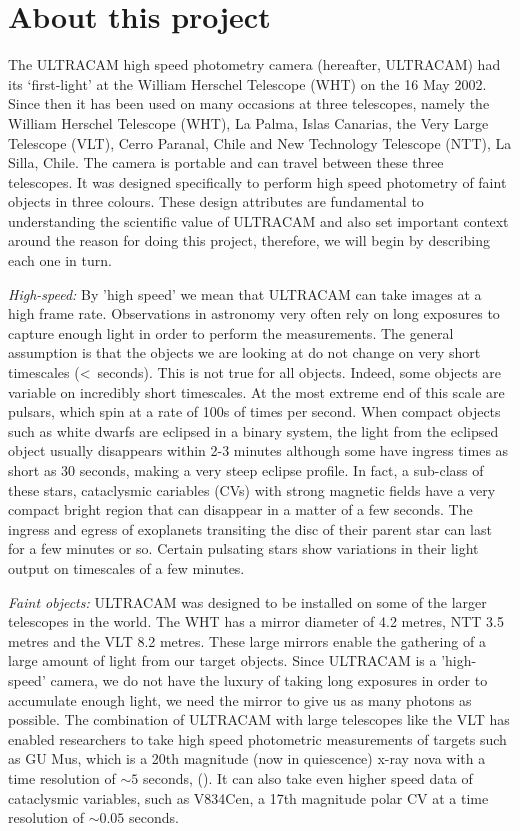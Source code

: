 \section{About this project} 

The ULTRACAM high speed photometry camera (hereafter, ULTRACAM) had its `first-light' at the William Herschel Telescope (WHT) on the 16 May 2002. Since then it has been used on many occasions at three telescopes, namely the William Herschel Telescope (WHT), La Palma, Islas Canarias, the Very Large Telescope (VLT), Cerro Paranal, Chile and New Technology Telescope (NTT), La Silla, Chile. The camera is portable and can travel between these three telescopes. It was designed specifically to perform high speed photometry of faint objects in three colours. These design attributes are fundamental to understanding the scientific value of ULTRACAM and also set important context around the reason for doing this project, therefore, we will begin by describing each one in turn. 

\emph{High-speed:} By 'high speed' we mean that ULTRACAM can take images at a high frame rate. Observations in astronomy very often rely on long exposures to capture enough light in order to perform the measurements. The general assumption is that the objects we are looking at do not change on very short timescales (\textless~seconds). This is not true for all objects. Indeed, some objects are variable on incredibly short timescales. At the most extreme end of this scale are pulsars, which spin at a rate of 100s of times per second. When compact objects such as white dwarfs are eclipsed in a binary system, the light from the eclipsed object usually disappears within 2-3 minutes although some have ingress times as short as 30 seconds, making a very steep eclipse profile. In fact, a sub-class of these stars, cataclysmic cariables (CVs) with strong magnetic fields have a very compact bright region that can disappear in a matter of a few seconds. The ingress and egress of exoplanets transiting the disc of their parent star can last for a few minutes or so. Certain pulsating stars show variations in their light output on timescales of a few minutes. 

\emph{Faint objects:} ULTRACAM was designed to be installed on some of the larger telescopes in the world. The WHT has a mirror diameter of 4.2 metres, NTT 3.5 metres and the VLT 8.2 metres. These large mirrors enable the gathering of a large amount of light from our target objects. Since ULTRACAM is a 'high-speed' camera, we do not have the luxury of taking long exposures in order to accumulate enough light, we need the mirror to give us as many photons as possible. The combination of ULTRACAM with large telescopes like the VLT has enabled researchers to take high speed photometric measurements of targets such as GU Mus, which is a 20th magnitude (now in quiescence) x-ray nova with a time resolution of $\sim 5$ seconds, (\cite{tariq2010}). It can also take even higher speed data of cataclysmic variables, such as V834Cen, a 17th magnitude polar CV at a time resolution of $\sim 0.05$ seconds.

